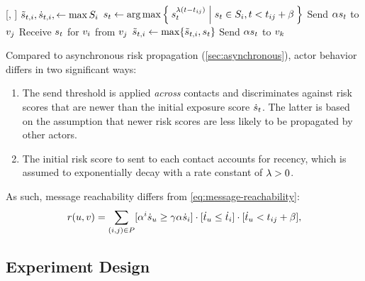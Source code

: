 \begin{function}{\nRiskPropagationActor}[\vGraph, \vScores]
    \State $\tilde{s}_{t, i}, \dot{s}_{t, i}, \leftarrow \max S_i$
      \State $s_t \leftarrow \operatorname{\arg\max} \Set{ s_t^{\lambda(t- t_{ij})} | s_t\in S_i, t< t_{ij} + \beta}$
      \State Send $\alpha s_t$ to $v_j$
    \EndFor
  \EndFor
    \State Receive $s_t$ for $v_i$ from $v_j$
    \State $\tilde{s}_{t, i} \leftarrow \max \{\tilde{s}_{t, i}, s_t\}$
        \State Send $\alpha s_t$ to $v_k$
      \EndIf
    \EndFor
  \EndWhile
\end{function}

Compared to asynchronous risk propagation (\cref{sec:asynchronous}), actor behavior differs in two significant ways:
\begin{enumerate}
  \item The send threshold is applied \emph{across} contacts and discriminates against risk scores that are newer than the initial exposure score $\dot{s}_t$. The latter is based on the assumption that newer risk scores are less likely to be propagated by other actors.
  \item The initial risk score to sent to each contact accounts for recency, which is assumed to exponentially decay with a rate constant of $\lambda > 0$.
\end{enumerate}
As such, message reachability differs from \cref{eq:message-reachability}:
\begin{equation}\label{eq:initial-message-reachability}
  r(u, v) = \sum_{(i, j) \in P} [\alpha^i \dot{s}_u \geq \gamma \alpha \dot{s}_i] \cdot [\dot{t}_u \leq \dot{t}_i] \cdot [\dot{t}_u < t_{ij} + \beta],
\end{equation}

\subsection{Experiment Design}

